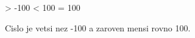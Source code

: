 \newcount\cislo
{}
\newif\ifcislojerozumne


\ifnum \cislo > -100
	\ifnum \cislo < 100
		\cislojerozumnetrue
	\else
		\ifnum \cislo = 100
			\cislojerozumnetrue
		\fi
	\fi
\fi



Cislo \the\cislo{} \ifcislojerozumne je \else neni \fi vetsi nez
-100 a zaroven mensi rovno 100.
\bye
